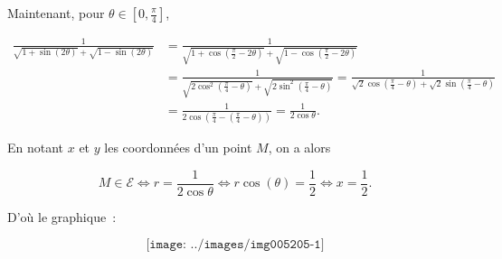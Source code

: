 {{Maintenant, pour $\theta\in[0,\frac{\pi}{4}]$,

\begin{align*}
\frac{1}{\sqrt{1+\sin(2\theta)}+\sqrt{1-\sin(2\theta)}}&=
\frac{1}{\sqrt{1+\cos(\frac{\pi}{2}-2\theta)}+\sqrt{1-\cos(\frac{\pi}{2}-2\theta)}}\\
 &=\frac{1}{\sqrt{2\cos^2(\frac{\pi}{4}-\theta)}+\sqrt{2\sin^2(\frac{\pi}{4}-\theta)}}
 =\frac{1}{\sqrt{2}\cos(\frac{\pi}{4}-\theta)+\sqrt{2}\sin(\frac{\pi}{4}-\theta)}\\
 &=\frac{1}{2\cos(\frac{\pi}{4}-(\frac{\pi}{4}-\theta))}=\frac{1}{2\cos\theta}.
\end{align*}

En notant $x$ et $y$ les coordonnées d'un point $M$, on a alors 

$$M\in\mathcal{E}\Leftrightarrow r=\frac{1}{2\cos\theta}\Leftrightarrow r\cos(\theta)=\frac{1}{2}\Leftrightarrow x=\frac{1}{2}.$$

D'où le graphique~:

$$\texttt{[image: ../images/img005205-1]}$$
}
}
